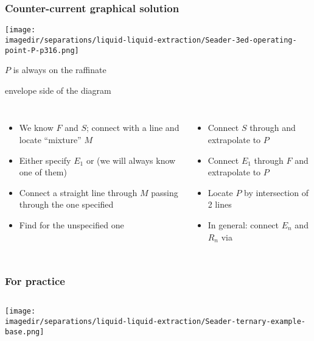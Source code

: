 \begin{frame}\frametitle{Counter-current graphical solution}
	\begin{center}
		\texttt{[image: \\imagedir/separations/liquid-liquid-extraction/Seader-3ed-operating-point-P-p316.png]}
	\end{center}
	
	\vspace{-3cm}
	\hfill {\small $P$ is always on the raffinate}
	
	\hfill {\small envelope side of the diagram}
	\vspace{2cm}
	\begin{columns}[t]
		\vspace{-18pt}
		{\scriptsize
			\begin{itemize}
				\item	We know $F$ and $S$; connect with a line and locate ``mixture'' $M$
				\item	Either specify $E_1$ or {\color{myRed}{$R_N$}} (we will always know one of them)
				\item	Connect a straight line through $M$ passing through the one specified
				\item	Find for the unspecified one {\color{myOrange}{[tie line]}}
			\end{itemize}}
		\vspace{-18pt}
		{\scriptsize	
			\begin{itemize}
				\item	Connect $S$ through {\color{myRed}{$R_N$}} and extrapolate to $P$
				\item	Connect $E_1$ through $F$ and extrapolate to $P$
				\item	Locate $P$ by intersection of 2 lines
				\item	In general: connect $E_n$ and $R_n$ via {\color{myOrange}{equilibrium tie lines}}
			\end{itemize}}
	\end{columns}
\end{frame}

\begin{frame}\frametitle{For practice}
	\begin{columns}[t]
			\begin{center}
				\texttt{[image: \\imagedir/separations/liquid-liquid-extraction/Seader-ternary-example-base.png]}
			\end{center}			
	\end{columns}
\end{frame}

